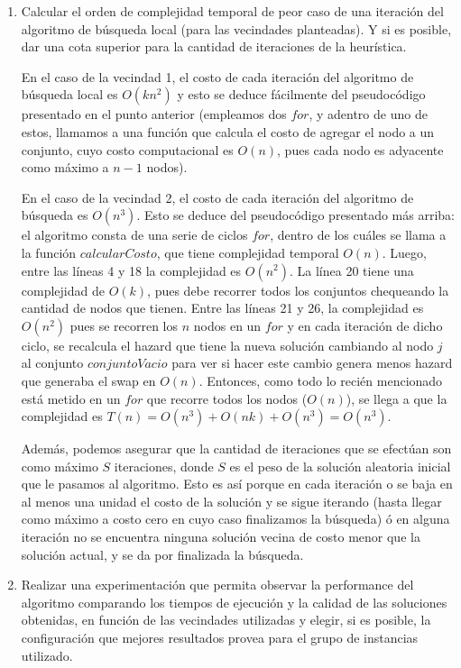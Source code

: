 \documentclass[11pt, a4paper, twoside]{article}
\begin{document}
\begin{enumerate}
		\item Calcular el orden de complejidad temporal de peor caso de una iteración del algoritmo de búsqueda local
			  (para las vecindades planteadas). Y si es posible, dar una cota superior para la cantidad de iteraciones
			  de la heurística. 
			  
			  En el caso de la vecindad 1, el costo de cada iteración del algoritmo de búsqueda local es $O(kn^2)$ y esto
			  se deduce fácilmente del pseudocódigo presentado en el punto anterior (empleamos dos $for$, y adentro de uno
			  de estos, llamamos a una función que calcula el costo de agregar el nodo a un conjunto, cuyo costo computacional
			  es $O(n)$, pues cada nodo es adyacente como máximo a $n-1$ nodos).
			  
			  En el caso de la vecindad 2, el costo de cada iteración del algoritmo de búsqueda es $ O(n^3) $. Esto se deduce
			  del pseudocódigo presentado más arriba: el algoritmo consta de una serie de ciclos $for$, dentro de los
			  cuáles se llama a la función $calcularCosto$, que tiene complejidad temporal $O(n)$. 
			  Luego, entre las líneas 4 y 18 la complejidad es $O(n^2)$. La línea 20 tiene una complejidad de $O(k)$, pues
			  debe recorrer todos los conjuntos chequeando la cantidad de nodos que tienen. Entre las líneas 21 y 26, la 
			  complejidad es $O(n^2)$ pues se recorren los $n$ nodos en un $for$ y en cada iteración de dicho ciclo, se 
			  recalcula el hazard que tiene la nueva solución cambiando al nodo $j$ al conjunto $conjuntoVacio$ para ver si
			  hacer este cambio genera menos hazard que generaba el swap en $O(n)$. 
			  Entonces, como todo lo recién mencionado está metido en un $for$ que recorre todos los nodos ($O(n)$), 
			  se llega a que la complejidad es $T(n) = O(n^3) + O(nk) + O(n^3) = O(n^3) $.
			  
			  Además, podemos asegurar que la cantidad de iteraciones que se efectúan son como máximo $S$ iteraciones, 
			  donde $S$ es el peso de la solución aleatoria inicial que le pasamos al algoritmo. Esto es así porque en cada
			  iteración o se baja en al menos una unidad el costo de la solución y se sigue iterando (hasta llegar como 
			  máximo a costo cero en cuyo caso finalizamos la búsqueda) ó en alguna iteración no se encuentra ninguna 
			  solución vecina de costo menor que la solución actual, y se da por finalizada la búsqueda.
			  
	    \item Realizar una experimentación que permita observar la performance del algoritmo comparando los tiempos
			  de ejecución y la calidad de las soluciones obtenidas, en función de las vecindades utilizadas y elegir,
			  si es posible, la configuración que mejores resultados provea para el grupo de instancias utilizado.
    \end{enumerate}
\end{document}
